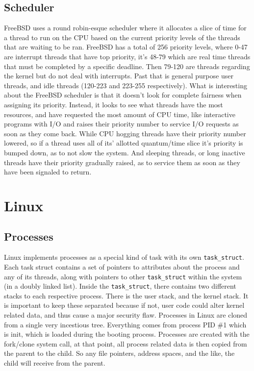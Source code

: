 \documentclass[10pt,conference,draftclsnofoot,onecolumn]{IEEEtran}
\begin{document}
\subsection{Scheduler}
    FreeBSD uses a round robin-esque scheduler where it allocates a slice of time for a thread to run on the CPU based on the current priority levels of the threads that are waiting to be ran. FreeBSD has a total of 256 priority levels\cite{2}, where 0-47 are interrupt threads that have top priority, it’s 48-79 which are real time threads that must be completed by a specific deadline. Then 79-120 are threads regarding the kernel but do not deal with interrupts. Past that is general purpose user threads, and idle threads (120-223 and 223-255 respectively). What is interesting about the FreeBSD scheduler is that it doesn’t look for complete fairness when assigning its priority. Instead, it looks to see what threads have the most resources, and have requested the most amount of CPU time, like interactive programs with I/O and raises their priority number to service I/O requests as soon as they come back. While CPU hogging threads have their priority number lowered, so if a thread uses all of its’ allotted quantum/time slice it’s priority is bumped down, as to not slow the system. \cite{2} And sleeping threads, or long inactive threads have their priority gradually raised, as to service them as soon as they have been signaled to return. \newline \newline


\section{Linux}
\subsection{Processes}
    Linux implements processes as a special kind of task with its own \texttt{task\_struct}. Each task struct contains a set of pointers to attributes about the process and any of its threads, along with pointers to other \texttt{task\_struct} within the system (in a doubly linked list). Inside the \texttt{task\_struct}, there contains two different stacks to each respective process. There is the user stack, and the kernel stack. It is important to keep these separated because if not, user code could alter kernel related data, and thus cause a major security flaw. \cite{4}
    Processes in Linux are cloned from a single very incestious tree. Everything comes from process PID \#1 which is init, which is loaded during the booting process. Processes are created with the fork/clone system call, at that point, all process related data is then copied from the parent to the child. So any file pointers, address spaces, and the like, the child will receive from the parent. 
\end{document}
